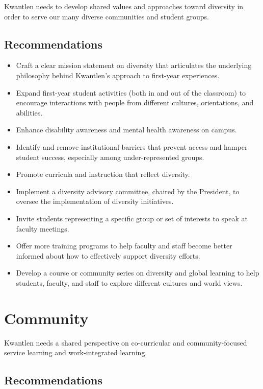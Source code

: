 \documentclass[11pt, letterpaper]{article}
\begin{document}
Kwantlen needs to develop shared values and approaches toward diversity in order to serve our many diverse communities and student groups.

\subsection{Recommendations}

\begin{itemize}

\item
  Craft a clear mission statement on diversity that articulates the
  underlying philosophy behind Kwantlen's approach to first-year
  experiences.
\item
  Expand first-year student activities (both in and out of the
  classroom) to encourage interactions with people from different
  cultures, orientations, and abilities.
\item
  Enhance disability awareness and mental health awareness on campus.
\item
  Identify and remove institutional barriers that prevent access and
  hamper student success, especially among under-represented groups.
\item
  Promote curricula and instruction that reflect diversity.
\item
  Implement a diversity advisory committee, chaired by the President, to oversee the implementation of diversity initiatives.
\item
  Invite students representing a specific group or set of interests to
  speak at faculty meetings.
\item
  Offer more training programs to help faculty and staff become better
  informed about how to effectively support diversity efforts.
\item
  Develop a course or community series on diversity and global learning
  to help students, faculty, and staff to explore different cultures and
  world views.

\end{itemize}

\section{Community}

Kwantlen needs a shared perspective on co-curricular and
community-focused service learning and work-integrated learning.

\subsection{Recommendations}
\end{document}
